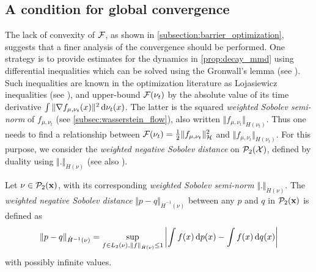 \subsection{A condition for global convergence}\label{sec:Lojasiewicz_inequality}%
The lack of convexity of ${{\mathcal F}}$, as shown in \cref{subsection:barrier_optimization}, suggests that a finer analysis of the convergence should be performed. One strategy is to provide estimates for the dynamics in \cref{prop:decay_mmd} using differential inequalities which can be solved using the Gronwall's lemma (see \cite{oguntuase2001inequality}). Such inequalities  are known in the optimization literature as Lojasiewicz inequalities (see \cite{Bolte:2016}), and upper-bound ${{\mathcal F}}(\nu_t)$ by the absolute value of its time derivative $\int \Vert \nabla f_{\mu,\nu_t}(x) \Vert^2 \mathop{}\!\mathrm{d} \nu_t(x)$.
The latter is the squared \textit{weighted Sobolev semi-norm} of $f_{\mu,\nu_t}$ (see \cref{subsec:wasserstein_flow}), also written  $\Vert f_{\mu,\nu_t} \Vert_{\dot{H}(\nu_t)}$. Thus one needs to find a relationship between ${{\mathcal F}}(\nu_t) = \frac{1}{2} \Vert f_{\mu,\nu_t} \Vert_{\mathcal{H}}^2 $ and $\Vert f_{\mu,\nu_t} \Vert_{\dot{H}(\nu_t)}$. For this purpose, we consider the \textit{weighted negative Sobolev distance} on $\mathcal{P}_2({{\mathcal X}})$, defined by duality using $\Vert . \Vert_{\dot{H}(\nu)}$ (see also \cite{Peyre:2011}).
\begin{definition}\label{def:neg_sobolev}
	Let $\nu\in \mathcal{P}_2({\mathbf x})$, with its corresponding \textit{weighted Sobolev semi-norm} $ \Vert . \Vert_{\dot{H}(\nu)} $. %
	The \textit{weighted negative Sobolev distance} $\Vert p - q \Vert_{\dot{H}^{-1}(\nu)}$ between any $p$ and $q$ in $\mathcal{P}_2({\mathbf x})$  is defined as
\begin{align}\label{eq:neg_sobolev}
	\Vert p - q \Vert_{\dot{H}^{-1}(\nu)} = \sup_{f\in L_2(\nu), \Vert f \Vert_{\dot{H}(\nu)} \leq 1 } \left\vert \int f(x)\mathop{}\!\mathrm{d} p(x) - \int f(x)\mathop{}\!\mathrm{d} q(x) \right\vert 
\end{align}	
with possibly infinite values.
\end{definition}
